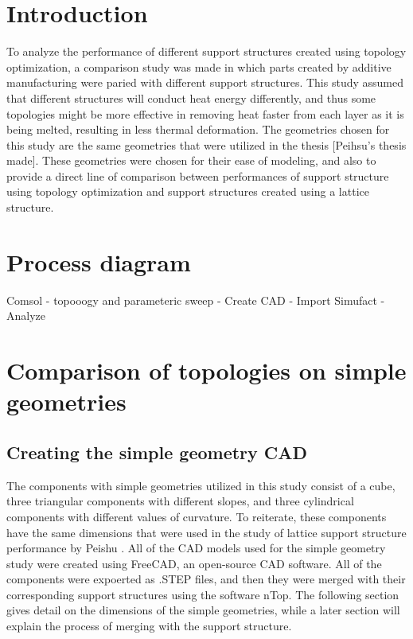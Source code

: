 \documentclass{article}
\begin{document}
	
\section{Introduction}

To analyze the performance of different support structures created using topology optimization, a comparison study was made in which parts created by additive manufacturing were paried with different support structures. This study assumed that different structures will conduct heat energy differently, and thus some topologies might be more effective in removing heat faster from each layer as it is being melted, resulting in less thermal deformation. 
The geometries chosen for this study are the same geometries that were utilized in the thesis
[Peihsu's thesis made]. These geometries were chosen for their ease of modeling, and also to provide
a direct line of comparison between performances of support structure using topology optimization
and support structures created using a lattice structure. 

\section{Process diagram}

Comsol - topooogy and parameteric sweep - Create CAD - Import Simufact - Analyze 


\section{Comparison of topologies on simple geometries}

\subsection{Creating the simple geometry CAD}

The components with simple geometries utilized in this study consist of a cube, three triangular
components with different slopes, and three cylindrical components with different values of
curvature. To reiterate, these components have the same dimensions that were used in the study of lattice
support structure performance by Peishu . All of the CAD models
used for the simple geometry study were created using FreeCAD, an open-source CAD software. All of the components were expoerted as .STEP files, and then they were merged with their corresponding support structures using the software nTop. The following section gives detail on the dimensions of the simple geometries, while a later section will explain the process of merging with the support structure.
\end{document}
